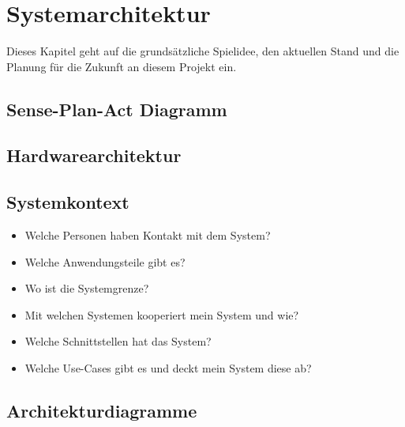 
\chapter{Systemarchitektur}
Dieses Kapitel geht auf die grundsätzliche Spielidee, den aktuellen Stand und die Planung für die Zukunft an diesem Projekt ein.

\section{Sense-Plan-Act Diagramm}

\section{Hardwarearchitektur}

\section{Systemkontext}
\begin{itemize}
	\item Welche Personen haben Kontakt mit dem System?
	\item Welche Anwendungsteile gibt es?
	\item Wo ist die Systemgrenze?
	\item Mit welchen Systemen kooperiert mein System und wie?
	\item Welche Schnittstellen hat das System?
	\item Welche Use-Cases gibt es und deckt mein System diese ab?
\end{itemize}

\section{Architekturdiagramme}

